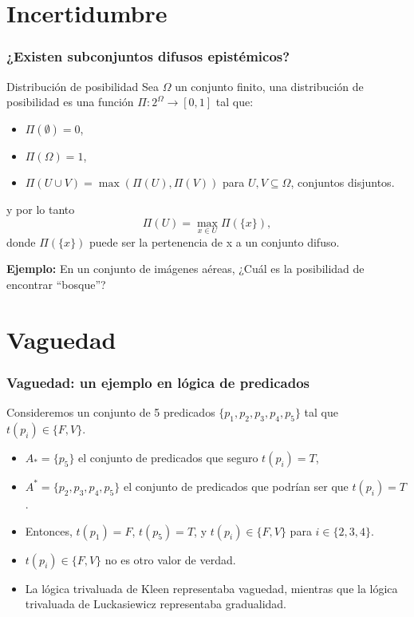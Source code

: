 \documentclass{beamer}
\theoremstyle{definition}
\begin{document}
\section{Incertidumbre}

\begin{frame}
  \frametitle{¿Existen subconjuntos difusos epistémicos?}
  \begin{block}{Distribución de posibilidad}
    Sea $\Omega$ un conjunto finito, una distribución de posibilidad es una
    función $\Pi: 2^\Omega \to [0, 1]$ tal que:
    \begin{itemize}
    \item $\Pi(\emptyset) = 0$,
    \item $\Pi(\Omega) = 1$,
    \item $\Pi(U \cup V) = \max(\Pi(U), \Pi(V))$ para $U, V \subseteq
      \Omega$, conjuntos disjuntos. 
    \end{itemize}
  \end{block}
\vspace{0.5cm}
y por lo tanto
$$
\Pi(U) = \max_{x \in U} \Pi(\{x\}),
$$
donde $\Pi(\{x\})$ puede ser la pertenencia de x a un conjunto difuso.

\vspace{0.5cm}

\textbf{Ejemplo:} En un conjunto de imágenes aéreas, ¿Cuál es la posibilidad
de encontrar ``bosque''?

\end{frame}

\section{Vaguedad}

\begin{frame}
  \frametitle{Vaguedad: un ejemplo en lógica de predicados}
Consideremos un conjunto de 5 predicados $\{p_1, p_2, p_3, p_4, p_5\}$ tal
que $t(p_i) \in \{F, V\}$.

\begin{itemize}
\item $A_* = \{p_5\}$ el conjunto de predicados que seguro $t(p_i) = T$,
\item $A^* = \{p_2, p_3, p_4, p_5\}$ el conjunto de predicados que
  podrían ser que $t(p_i)= T$.
\item Entonces, $t(p_1) = F$, $t(p_5) = T$, y $t(p_i) \in \{F, V\}$
  para $i \in \{2, 3, 4\}$.
\item $t(p_i) \in \{F, V\}$ no es otro valor de verdad. 
\item La lógica trivaluada de Kleen representaba vaguedad, mientras que la
  lógica trivaluada de Luckasiewicz representaba gradualidad. 
\end{itemize}
\end{frame}
\end{document}
